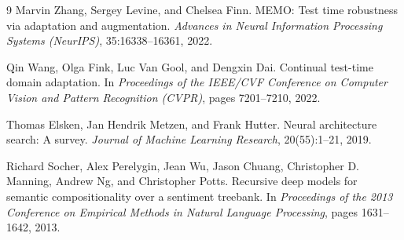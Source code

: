 \documentclass[11pt,a4paper]{article}
\theoremstyle{definition}
\begin{document}
\begin{thebibliography}{9}
Marvin Zhang, Sergey Levine, and Chelsea Finn.
MEMO: Test time robustness via adaptation and augmentation.
\textit{Advances in Neural Information Processing Systems (NeurIPS)}, 35:16338--16361, 2022.

Qin Wang, Olga Fink, Luc Van Gool, and Dengxin Dai.
Continual test-time domain adaptation.
In \textit{Proceedings of the IEEE/CVF Conference on Computer Vision and Pattern Recognition (CVPR)}, pages 7201--7210, 2022.

Thomas Elsken, Jan Hendrik Metzen, and Frank Hutter.
Neural architecture search: A survey.
\textit{Journal of Machine Learning Research}, 20(55):1--21, 2019.

Richard Socher, Alex Perelygin, Jean Wu, Jason Chuang, Christopher D. Manning, Andrew Ng, and Christopher Potts.
Recursive deep models for semantic compositionality over a sentiment treebank.
In \textit{Proceedings of the 2013 Conference on Empirical Methods in Natural Language Processing}, pages 1631--1642, 2013.

\end{thebibliography}
\end{document}
